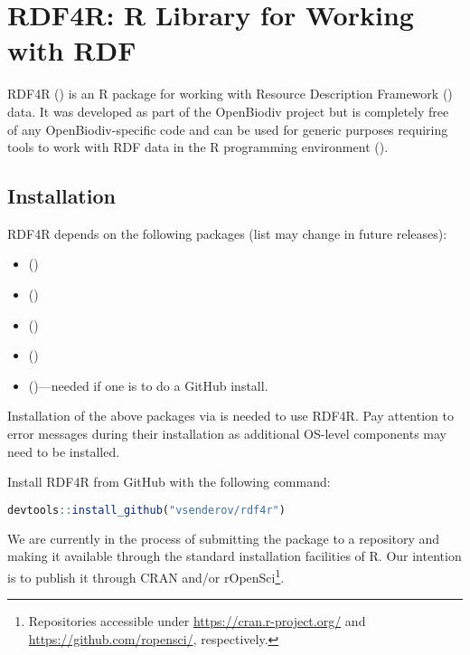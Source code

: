 \chapter{RDF4R: R Library for Working with RDF}
\label{chapter-rdf4r}

RDF4R () is an R package for working with Resource Description Framework (\cite{rdf_working_group_resource_2014}) data. It was developed as part of the OpenBiodiv project but is completely free of any OpenBiodiv-specific code and can be used for generic purposes requiring tools to work with RDF data in the R programming environment (\cite{r_core_team_r:_2016}).

\section{Installation}

RDF4R depends on the following packages (list may change in future releases):

\begin{itemize}
\item{ (\cite{grothendieck_gsubfn:_2018})}
\item{ (\cite{wickham_httr:_2017})}
\item{ (\cite{wickham_xml2:_2018})}
\item{ (\cite{chang_r6:_2017})}
\item{{ (\cite{wickham_devtools:_2018})}---needed if one is to do a GitHub install.}
\end{itemize}

Installation of the above packages via  is needed to use RDF4R. Pay attention to error messages during their installation as additional OS-level components may need to be installed.

Install RDF4R from GitHub with the following command:

\begin{lstlisting}[language=R,
basicstyle=\ttfamily\tiny]
devtools::install_github("vsenderov/rdf4r")
\end{lstlisting}

We are currently in the process of submitting the package to a repository and making it available through the standard installation facilities of R. Our intention is to publish it through CRAN and/or rOpenSci\footnote{Repositories accessible under \url{https://cran.r-project.org/} and \url{https://github.com/ropensci/}, respectively.}.

